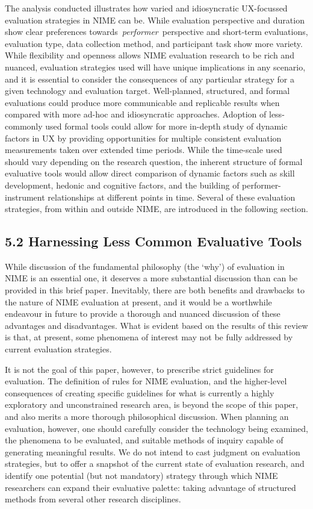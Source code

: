 \documentclass[sigconf]{nimeart}
\begin{document}
The analysis conducted illustrates how varied and idiosyncratic UX-focussed evaluation strategies in NIME can be. While evaluation perspective and duration show clear preferences towards~\emph{performer}~perspective and short-term evaluations, evaluation type, data collection method, and participant task show more variety. While flexibility and openness allows NIME evaluation research to be rich and nuanced, evaluation strategies used will have unique implications in any scenario, and it is essential to consider the consequences of any particular strategy for a given technology and evaluation target. Well-planned, structured, and formal evaluations could produce more communicable and replicable results when compared with more ad-hoc and idiosyncratic approaches. Adoption of less-commonly used formal tools could allow for more in-depth study of dynamic factors in UX by providing opportunities for multiple consistent evaluation measurements taken over extended time periods. While the time-scale used should vary depending on the research question, the inherent structure of formal evaluative tools would allow direct comparison of dynamic factors such as skill development, hedonic and cognitive factors, and the building of performer-instrument relationships at different points in time. Several of these evaluation strategies, from within and outside NIME, are introduced in the following section.

\subsection{5.2 Harnessing Less Common Evaluative Tools}\label{harnessing-less-common-evaluative-tools}

While discussion of the fundamental philosophy (the `why') of evaluation in NIME is an essential one, it deserves a more substantial discussion than can be provided in this brief paper. Inevitably, there are both benefits and drawbacks to the nature of NIME evaluation at present, and it would be a worthwhile endeavour in future to provide a thorough and nuanced discussion of these advantages and disadvantages. What is evident based on the results of this review is that, at present, some phenomena of interest may not be fully addressed by current evaluation strategies.

It is not the goal of this paper, however, to prescribe strict guidelines for evaluation. The definition of rules for NIME evaluation, and the higher-level consequences of creating specific guidelines for what is currently a highly exploratory and unconstrained research area, is beyond the scope of this paper, and also merits a more thorough philosophical discussion. When planning an evaluation, however, one should carefully consider the technology being examined, the phenomena to be evaluated, and suitable methods of inquiry capable of generating meaningful results. We do not intend to cast judgment on evaluation strategies, but to offer a snapshot of the current state of evaluation research, and identify one potential (but not mandatory) strategy through which NIME researchers can expand their evaluative palette: taking advantage of structured methods from several other research disciplines.
\end{document}
